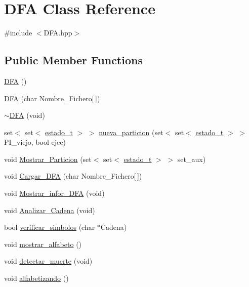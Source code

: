 \hypertarget{class_d_f_a}{}\section{D\+FA Class Reference}
\label{class_d_f_a}


{\ttfamily \#include $<$D\+F\+A.\+hpp$>$}

\subsection*{Public Member Functions}
\begin{DoxyCompactItemize}
\item 
\hyperlink{class_d_f_a_a0739bd751a325dd162604ed63fadea69}{D\+FA} ()
\item 
\hyperlink{class_d_f_a_a8ea9d7e634546e4138c011d5b4e47e3d}{D\+FA} (char Nombre\+\_\+\+Fichero\mbox{[}$\,$\mbox{]})
\item 
\hyperlink{class_d_f_a_aa6398a02d0f2d3a57cee0c7d8b3ec9e1}{$\sim$\+D\+FA} (void)
\item 
set$<$ set$<$ \hyperlink{classestado__t}{estado\+\_\+t} $>$ $>$ \hyperlink{class_d_f_a_a427b050f652917a2ef10c6f0bcc62feb}{nueva\+\_\+particion} (set$<$ set$<$ \hyperlink{classestado__t}{estado\+\_\+t} $>$ $>$ P\+I\+\_\+viejo, bool ejec)
\item 
void \hyperlink{class_d_f_a_acbe2cc4d41a1e30a8c185b262189ac71}{Mostrar\+\_\+\+Particion} (set$<$ set$<$ \hyperlink{classestado__t}{estado\+\_\+t} $>$ $>$ set\+\_\+aux)
\item 
void \hyperlink{class_d_f_a_a0e252de663175ef960d025d8b78cbc6d}{Cargar\+\_\+\+D\+FA} (char Nombre\+\_\+\+Fichero\mbox{[}$\,$\mbox{]})
\item 
void \hyperlink{class_d_f_a_aa5259d18788a67e78b21be91dbadc88f}{Mostrar\+\_\+infor\+\_\+\+D\+FA} (void)
\item 
void \hyperlink{class_d_f_a_a056c38fca9a65b60acea799ebe9b743b}{Analizar\+\_\+\+Cadena} (void)
\item 
bool \hyperlink{class_d_f_a_a58c2890860965eb2c1dc337f667f92e5}{verificar\+\_\+simbolos} (char $\ast$Cadena)
\item 
void \hyperlink{class_d_f_a_a169da2171e0e1182cd1da0948df45172}{mostrar\+\_\+alfabeto} ()
\item 
void \hyperlink{class_d_f_a_abaac46234616f0feda45b0a91ce78d39}{detectar\+\_\+muerte} (void)
\item 
void \hyperlink{class_d_f_a_a3b9768781e98480f0f9677fadb3eb78e}{alfabetizando} ()
\item 

\end{DoxyCompactItemize}
